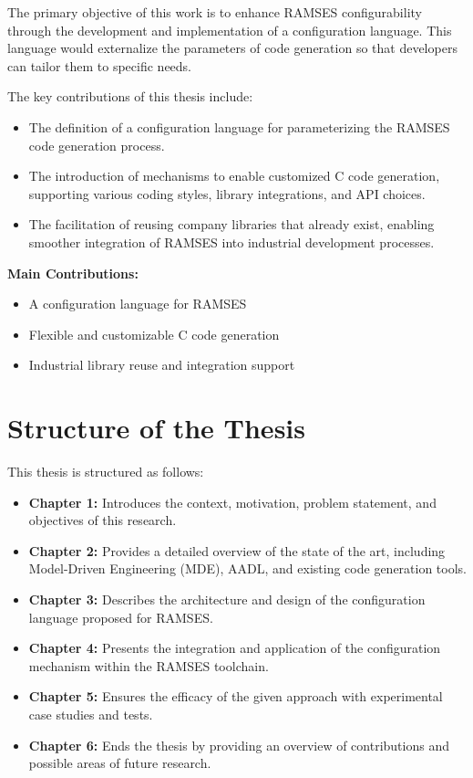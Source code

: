 The primary objective of this work is to enhance \gls{RAMSES} configurability through the development and implementation of a configuration language. This language would externalize the parameters of code generation so that developers can tailor them to specific needs.

The key contributions of this thesis include:
\begin{itemize}
	\item The definition of a configuration language for parameterizing the \gls{RAMSES} code generation process.
	\item The introduction of mechanisms to enable customized C code generation, supporting various coding styles, library integrations, and \gls{API} choices.
	\item The facilitation of reusing company libraries that already exist, enabling smoother integration of \gls{RAMSES} into industrial development processes.
\end{itemize}

\begin{tcolorbox}[colback=blue!5]
	\textbf{Main Contributions:}
	\begin{itemize}
		\item A configuration language for \gls{RAMSES}
		\item Flexible and customizable C code generation
		\item Industrial library reuse and integration support
	\end{itemize}
\end{tcolorbox}



\section{Structure of the Thesis}

This thesis is structured as follows:

\begin{itemize}
	\item \textbf{Chapter 1:} Introduces the context, motivation, problem statement, and objectives of this research.
	\item \textbf{Chapter 2:} Provides a detailed overview of the state of the art, including Model-Driven Engineering (MDE), AADL, and existing code generation tools.
	\item \textbf{Chapter 3:} Describes the architecture and design of the configuration language proposed for \gls{RAMSES}.
	\item \textbf{Chapter 4:} Presents the integration and application of the configuration mechanism within the \gls{RAMSES} toolchain.
	\item \textbf{Chapter 5:} Ensures the efficacy of the given approach with experimental case studies and tests.
	\item \textbf{Chapter 6:} Ends the thesis by providing an overview of contributions and possible areas of future research.
\end{itemize}










